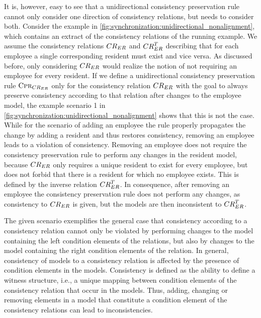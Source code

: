 It is, however, easy to see that a unidirectional consistency preservation rule cannot only consider one direction of consistency relations, but needs to consider both.
Consider the example in \autoref{fig:synchronization:unidirectional_nonalignment}, which contains an extract of the consistency relations of the running example.
We assume the consistency relations $\consistencyrelation{CR}{ER}$ and $\consistencyrelation{CR}{ER}^T$ describing that for each employee a single corresponding resident must exist and vice versa.
As discussed before, only considering $\consistencyrelation{CR}{ER}$ would realize the notion of not requiring an employee for every resident.
If we define a unidirectional consistency preservation rule $\consistencypreservationrule{\consistencyrelation{CR}{ER}}$ only for the consistency relation $\consistencyrelation{CR}{ER}$ with the goal to always preserve consistency according to that relation after changes to the employee model, the example scenario 1 in \autoref{fig:synchronization:unidirectional_nonalignment} shows that this is not the case.
While for the scenario of adding an employee the rule properly propagates the change by adding a resident and thus restores consistency, removing an employee leads to a violation of consistency.
Removing an employee does not require the consistency preservation rule to perform any changes in the resident model, because $\consistencyrelation{CR}{ER}$ only requires a unique resident to exist for every employee, but does not forbid that there is a resident for which no employee exists.
This is defined by the inverse relation $\consistencyrelation{CR}{ER}^T$.
In consequence, after removing an employee the consistency preservation rule does not perform any changes, as consistency to $\consistencyrelation{CR}{ER}$ is given, but the models are then inconsistent to $\consistencyrelation{CR}{ER}^T$.

The given scenario exemplifies the general case that consistency according to a consistency relation cannot only be violated by performing changes to the model containing the left condition elements of the relations, but also by changes to the model containing the right condition elements of the relation.
In general, consistency of models to a consistency relation is affected by the presence of condition elements in the models.
Consistency is defined as the ability to define a witness structure, i.e., a unique mapping between condition elements of the consistency relation that occur in the models.
Thus, adding, changing or removing elements in a model that constitute a condition element of the consistency relations can lead to inconsistencies.

